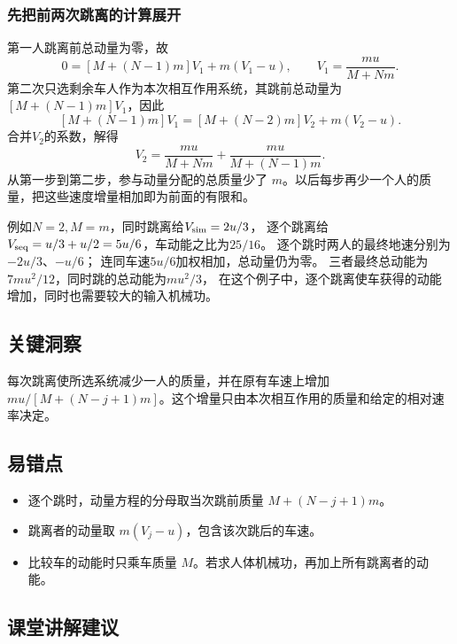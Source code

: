 \documentclass[UTF8,fontset=fandol,a4paper,11pt]{ctexart}
\begin{document}
\subsubsection*{先把前两次跳离的计算展开}
第一人跳离前总动量为零，故
\[
0=[M+(N-1)m]V_1+m(V_1-u),
\qquad V_1=\frac{mu}{M+Nm}.
\]
第二次只选剩余车人作为本次相互作用系统，其跳前总动量为
$[M+(N-1)m]V_1$，因此
\[
[M+(N-1)m]V_1=[M+(N-2)m]V_2+m(V_2-u).
\]
合并$V_2$的系数，解得
\[
V_2=\frac{mu}{M+Nm}+\frac{mu}{M+(N-1)m}.
\]
从第一步到第二步，参与动量分配的总质量少了 $m$。以后每步再少一个人的质量，把这些速度增量相加即为前面的有限和。

例如$N=2,M=m$，同时跳离给$V_{\rm sim}=2u/3$，
逐个跳离给$V_{\rm seq}=u/3+u/2=5u/6$，车动能之比为$25/16$。
逐个跳时两人的最终地速分别为$-2u/3$、$-u/6$；
连同车速$5u/6$加权相加，总动量仍为零。
三者最终总动能为$7mu^2/12$，同时跳的总动能为$mu^2/3$，
在这个例子中，逐个跳离使车获得的动能增加，同时也需要较大的输入机械功。




\subsection*{关键洞察}

每次跳离使所选系统减少一人的质量，并在原有车速上增加 $mu/[M+(N-j+1)m]$。这个增量只由本次相互作用的质量和给定的相对速率决定。



\subsection*{易错点}

\begin{itemize}
\item 逐个跳时，动量方程的分母取当次跳前质量 $M+(N-j+1)m$。
\item 跳离者的动量取 $m(V_j-u)$，包含该次跳后的车速。
\item 比较车的动能时只乘车质量 $M$。若求人体机械功，再加上所有跳离者的动能。
\end{itemize}



\subsection*{课堂讲解建议}
\end{document}
